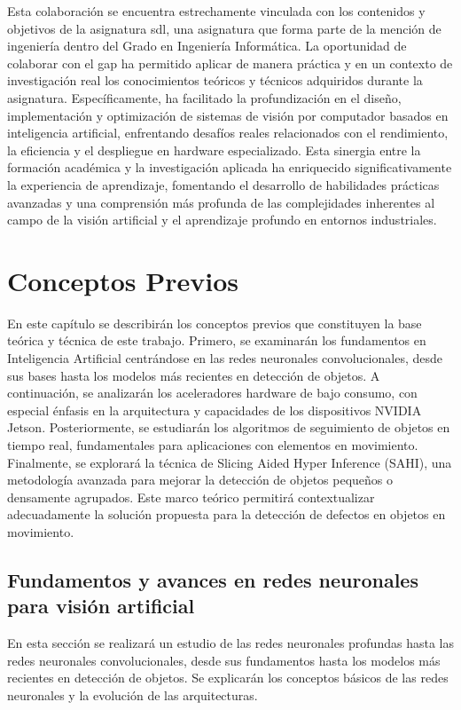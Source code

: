 \documentclass[11pt,spanish,listoffigures,listoftables]{tfgetsinf}
\begin{document}
Esta colaboración se encuentra estrechamente vinculada con los contenidos y objetivos de la asignatura \gls{sdl}, una asignatura que forma parte de la mención de ingeniería dentro del Grado en Ingeniería Informática. La oportunidad de colaborar con el \gls{gap} ha permitido aplicar de manera práctica y en un contexto de investigación real los conocimientos teóricos y técnicos adquiridos durante la asignatura. Específicamente, ha facilitado la profundización en el diseño, implementación y optimización de sistemas de visión por computador basados en inteligencia artificial, enfrentando desafíos reales relacionados con el rendimiento, la eficiencia y el despliegue en hardware especializado. Esta sinergia entre la formación académica y la investigación aplicada ha enriquecido significativamente la experiencia de aprendizaje, fomentando el desarrollo de habilidades prácticas avanzadas y una comprensión más profunda de las complejidades inherentes al campo de la visión artificial y el aprendizaje profundo en entornos industriales.

\chapter{Conceptos Previos}

En este capítulo se describirán los conceptos previos que constituyen la base teórica y técnica de este trabajo. Primero, se examinarán los fundamentos en Inteligencia Artificial centrándose en las redes neuronales convolucionales, desde sus bases hasta los modelos más recientes en detección de objetos. A continuación, se analizarán los aceleradores hardware de bajo consumo, con especial énfasis en la arquitectura y capacidades de los dispositivos NVIDIA Jetson. Posteriormente, se estudiarán los algoritmos de seguimiento de objetos en tiempo real, fundamentales para aplicaciones con elementos en movimiento. Finalmente, se explorará la técnica de Slicing Aided Hyper Inference (SAHI), una metodología avanzada para mejorar la detección de objetos pequeños o densamente agrupados. Este marco teórico permitirá contextualizar adecuadamente la solución propuesta para la detección de defectos en objetos en movimiento.

\section{Fundamentos y avances en redes neuronales para visión artificial} \label{sec:fundamentos_avances}
En esta sección se realizará un estudio de las redes neuronales profundas hasta las redes neuronales convolucionales, desde sus fundamentos hasta los modelos más recientes en detección de objetos. Se explicarán los conceptos básicos de las redes neuronales y la evolución de las arquitecturas.
\end{document}
